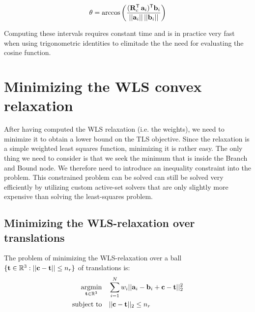 \begin{equation}
	\begin{aligned}
		\theta = \arccos \left( \frac{(\mathbf{R}_c^{\mathsf{T}} \, \mathbf{a}_i )^{\mathsf{T}} \mathbf{b}_i}{|| \mathbf{a}_i || \, || \mathbf{b}_i ||} \right)
	\end{aligned}
\end{equation}

Computing these intervals requires constant time and is in practice very fast when using trigonometric identities to elimitade the the need for evaluating the cosine function.


\section{Minimizing the WLS convex relaxation}
After having computed the WLS relaxation (i.e. the weights), we need to minimize it to obtain a lower bound on the TLS objective. 
Since the relaxation is a simple weighted least squares function, minimizing it is rather easy. The only thing we need to consider is that we seek the minimum that is inside the Branch and Bound node. We therefore need to introduce an inequality constraint into the problem.
This constrained problem can be solved can still be solved very efficiently by utilizing custom active-set solvers that are only slightly more expensive than solving the least-squares problem.

\subsection{Minimizing the WLS-relaxation over translations}

The problem of minimizing the WLS-relaxation over a ball $\{ \mathbf{t} \in \mathbb{R}^3 : || \mathbf{c} - \mathbf{t} || \leq n_r \}$ of translations is:
\begin{equation}
	\label{eq:tls-twls-constrained}
	\begin{aligned}
		\operatorname*{argmin}_{\mathbf{t} \in \mathbb{R}^3} \quad &\sum_{i=1}^{N} w_i ||\mathbf{a}_i - \mathbf{b}_i + \mathbf{c} - \mathbf{t}||_2^2 \\
		\text{subject to} \quad  &||\mathbf{c} - \mathbf{t}||_2 \leq n_r
	\end{aligned}
\end{equation}

